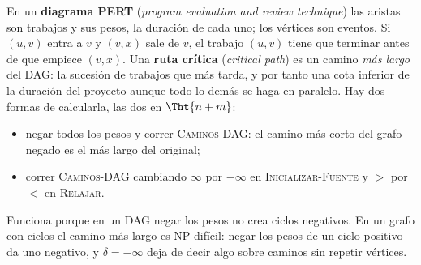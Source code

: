 \documentclass[11pt,letterpaper]{article}
\begin{document}
En un \textbf{diagrama PERT} (\textit{program evaluation and review
technique}) las aristas son trabajos y sus pesos, la duración de cada
uno; los vértices son eventos. Si $(u, v)$ entra a $v$ y $(v, x)$ sale
de $v$, el trabajo $(u, v)$ tiene que terminar antes de que empiece
$(v, x)$. Una \textbf{ruta crítica} (\textit{critical path}) es un
camino \emph{más largo} del DAG: la sucesión de trabajos que más
tarda, y por tanto una cota inferior de la duración del proyecto
aunque todo lo demás se haga en paralelo. Hay dos formas de
calcularla, las dos en $\Tht{n + m}$:
\begin{itemize}[itemsep=0.1em]
  \item negar todos los pesos y correr \textsc{Caminos-DAG}: el
        camino más corto del grafo negado es el más largo del
        original;
  \item correr \textsc{Caminos-DAG} cambiando $\infty$ por $-\infty$
        en \textsc{Inicializar-Fuente} y $>$ por $<$ en
        \textsc{Relajar}.
\end{itemize}
Funciona porque en un DAG negar los pesos no crea ciclos negativos.
En un grafo con ciclos el camino más largo es NP-difícil: negar los
pesos de un ciclo positivo da uno negativo, y $\delta = -\infty$ deja
de decir algo sobre caminos sin repetir vértices.
\end{document}
